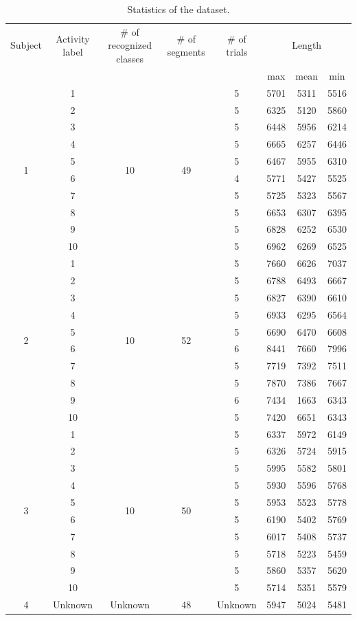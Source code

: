 \documentclass[graybox]{svmult}
\begin{document}
\begin{table}[ht]
    \centering
    \caption{Statistics of the dataset.}
    \begin{tabular}{c|c|c|c|c|c|c|c}\hline\hline
    Subject & Activity label& \# of recognized classes & \# of segments & \# of trials & \multicolumn{3}{c}{Length} \\
    &&&&&max&mean&min\\\hline
    \multirow{10}{*}{1} & 1 & \multirow{10}{*}{10} & \multirow{10}{*}{49} & 5 & 5701 & 5311 & 5516\\
    & 2 & & & 5 & 6325 & 5120 & 5860\\
    & 3 & & & 5 & 6448 & 5956 & 6214\\
    & 4 & & & 5 & 6665 & 6257 & 6446\\
    & 5 & & & 5 & 6467 & 5955 & 6310\\
    & 6 & & & 4 & 5771 & 5427 & 5525\\ 
    & 7 & & & 5 & 5725 & 5323 & 5567\\ 
    & 8 & & & 5 & 6653 & 6307 & 6395\\ 
    & 9 & & & 5 & 6828 & 6252 & 6530\\
    & 10 & & & 5 &6962 & 6269 & 6525\\ \hline
    \multirow{10}{*}{2} & 1 & \multirow{10}{*}{10} & \multirow{10}{*}{52} & 5 & 7660 & 6626 & 7037\\
    & 2 & & & 5 & 6788 & 6493 & 6667\\
    & 3 & & & 5 & 6827 & 6390 & 6610\\ 
    & 4 & & & 5 & 6933 & 6295 & 6564\\
    & 5 & & & 5 & 6690 & 6470 & 6608\\
    & 6 & & & 6 & 8441 & 7660 & 7996\\
    & 7 & & & 5 & 7719 & 7392 & 7511\\
    & 8 & & & 5 & 7870 & 7386 & 7667\\ 
    & 9 & & & 6 & 7434 & 1663 & 6343\\
    & 10 & & & 5 &7420 & 6651 & 6343\\ \hline
    \multirow{10}{*}{3} & 1 & \multirow{10}{*}{10} & \multirow{10}{*}{50} & 5 & 6337 & 5972 & 6149\\
    & 2 & & & 5 & 6326 & 5724 & 5915\\
    & 3 & & & 5 & 5995 & 5582 & 5801\\
    & 4 & & & 5 & 5930 & 5596 & 5768\\
    & 5 & & & 5 & 5953 & 5523 & 5778\\
    & 6 & & & 5 & 6190 & 5402 & 5769\\
    & 7 & & & 5 & 6017 & 5408 & 5737\\ 
    & 8 & & & 5 & 5718 & 5223 & 5459\\
    & 9 & & & 5 & 5860 & 5357 & 5620\\
    & 10 & & & 5 &5714 & 5351 & 5579\\ \hline
    4 & Unknown & Unknown & 48 & Unknown & 5947 & 5024 & 5481\\ \hline
    \end{tabular}
    \label{tab:stats}
\end{table}
\end{document}
